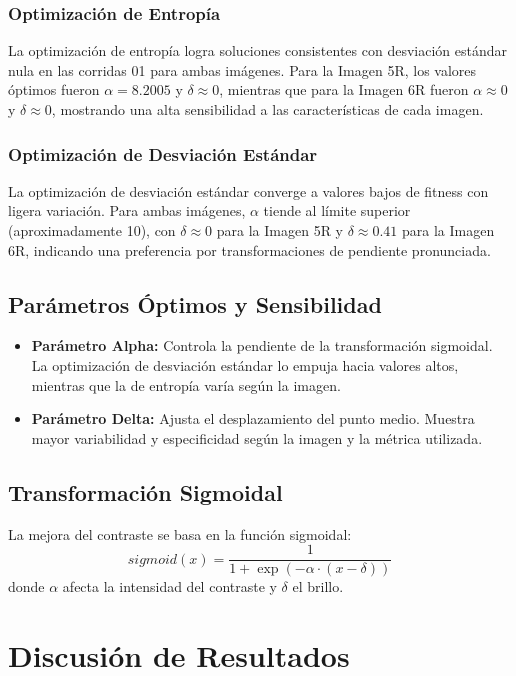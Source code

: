 \subsubsection{Optimización de Entropía}
La optimización de entropía logra soluciones consistentes con desviación estándar nula en las corridas 01 para ambas imágenes. Para la Imagen 5R, los valores óptimos fueron \(\alpha = 8.2005\) y \(\delta \approx 0\), mientras que para la Imagen 6R fueron \(\alpha \approx 0\) y \(\delta \approx 0\), mostrando una alta sensibilidad a las características de cada imagen.

\subsubsection{Optimización de Desviación Estándar}
La optimización de desviación estándar converge a valores bajos de fitness con ligera variación. Para ambas imágenes, \(\alpha\) tiende al límite superior (aproximadamente 10), con \(\delta \approx 0\) para la Imagen 5R y \(\delta \approx 0.41\) para la Imagen 6R, indicando una preferencia por transformaciones de pendiente pronunciada.

\subsection{Parámetros Óptimos y Sensibilidad}
\begin{itemize}
    \item \textbf{Parámetro Alpha:} Controla la pendiente de la transformación sigmoidal. La optimización de desviación estándar lo empuja hacia valores altos, mientras que la de entropía varía según la imagen.
    \item \textbf{Parámetro Delta:} Ajusta el desplazamiento del punto medio. Muestra mayor variabilidad y especificidad según la imagen y la métrica utilizada.
\end{itemize}

\subsection{Transformación Sigmoidal}
La mejora del contraste se basa en la función sigmoidal:
\begin{equation}
sigmoid(x) = \frac{1}{1 + \exp(-\alpha \cdot (x - \delta))}
\end{equation}
donde \(\alpha\) afecta la intensidad del contraste y \(\delta\) el brillo.

\section{Discusión de Resultados}

